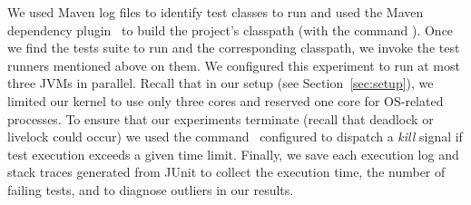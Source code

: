 
We used Maven log files to identify test classes to run and used the
Maven dependency plugin~\cite{maven-dep} to build the project's
classpath (with the command ).
Once we find the tests suite to run and the corresponding classpath,
we invoke the test runners mentioned above on them.  We configured
this experiment to run at most three JVMs in parallel.  Recall that in
our setup (see Section~\ref{sec:setup}), we limited our kernel to use
only three cores and reserved one core for OS-related processes.  To
ensure that our experiments terminate (recall that deadlock or
livelock could occur) we used the 
command~\cite{timeout-cmd} configured to dispatch a \emph{kill} signal
if test execution exceeds a given time limit. Finally, we save each
execution log and stack traces generated from JUnit to collect the
execution time, the number of failing tests, and to diagnose outliers
in our results.





